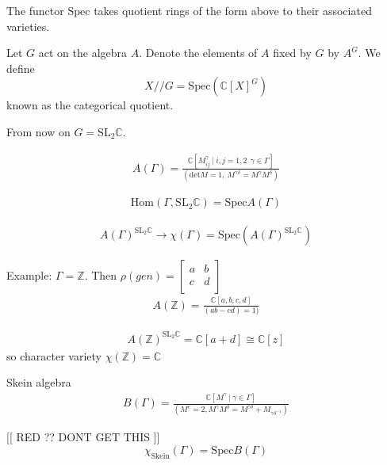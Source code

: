 The functor $\mathrm{Spec} $ takes quotient rings of the form above to their associated varieties. 

Let $ G $ act on the algebra $ A$. 
Denote the elements of $A$ fixed by $G$ by $A^G$. 
We define 
\begin{equation}
    X//G = \mathrm{Spec}( \mathbb{C} [X] ^G) 
\end{equation}
known as the categorical quotient. 

From now on $G = \mathrm{SL}_2 \mathbb{C} $. 

\begin{align}
    A(\Gamma) = \frac{\mathbb{C} [ M ^\gamma _{ij} ~|~ i,j =1,2~~ \gamma \in \Gamma]}{(\mathrm{det}M = 1, ~ M^{\gamma \delta}=M^{\gamma} M^{\delta})}
\end{align}

\begin{align}
    \mathrm{Hom}(\Gamma, \mathrm{SL}_2 \mathbb{C} ) = \mathrm{Spec}A(\Gamma) 
\end{align}

\begin{align}
    A(\Gamma) ^{\mathrm{SL}_2 \mathbb{C} } \rightarrow \chi(\Gamma) = \mathrm{Spec}(A(\Gamma) ^{\mathrm{SL}_2 \mathbb{C} }) 
\end{align}

Example: 
$\Gamma = \mathbb{Z} $. 
Then $\rho(gen) = \left[ \begin{array}{rr} a & b \\ c & d \\ \end{array} \right]  $ 
\begin{align}
    A(\mathbb{Z} ) = \frac{\mathbb{C} [a,b,c,d] }{ (ab-cd)=1) } 
\end{align}

\begin{align}
    A(\mathbb{Z} ) ^{ \mathrm{SL}_2 \mathbb{C} } = \mathbb{C} [a+d] \cong \mathbb{C} [z]
\end{align}
so character variety $ \chi(\mathbb{Z} ) = \mathbb{C}  $

Skein algebra 
\begin{align}
    B(\Gamma) = \frac{\mathbb{C} [ M^\gamma ~|~ \gamma \in \Gamma] }{(M^e = 2, M^\gamma M^\delta = M^{\gamma \delta} + M_{\gamma \delta ^{-1}} )}
\end{align}

[[ RED ?? DONT GET THIS ]] 
    \begin{equation}
        \chi_{\mathrm{Skein}} (\Gamma) = \mathrm{Spec} B(\Gamma) 
    \end{equation}

